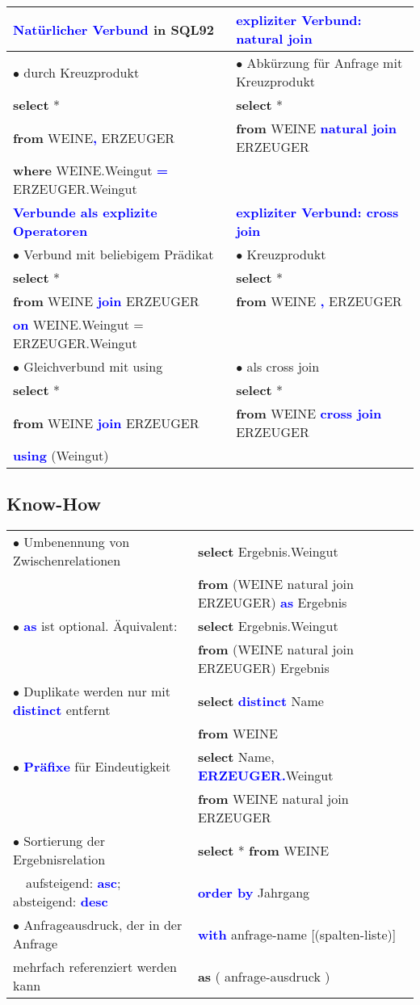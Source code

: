 \documentclass{scrartcl}
\newcommand{\key}[1]{{\textcolor{blue}{\textbf{#1}}}}
\newcommand{\select}{\textbf{select }}
\newcommand{\from}{\textbf{from }}
\newcommand{\where}{\textbf{where }}
\begin{document}
{\renewcommand{\arraystretch}{1.25}
\begin{tabular}{|l|l|}
	\hline
	\key{Natürlicher Verbund} in SQL92 & \key{expliziter Verbund: natural join}  \\
	\hline
	$\bullet$ durch Kreuzprodukt & $\bullet$ Abkürzung für Anfrage mit Kreuzprodukt \\
	\select * & \select *  \\
	\from WEINE\key{,} ERZEUGER & \from WEINE \key{natural join} ERZEUGER \\
	\where WEINE.Weingut \key{=} ERZEUGER.Weingut &\\
	\hline
	\key{Verbunde als explizite Operatoren} & \key{expliziter Verbund: cross join}\\
	\hline
	$\bullet$ Verbund mit beliebigem Prädikat & $\bullet$ Kreuzprodukt\\
	\select * & \select *\\
	\from WEINE \key{join} ERZEUGER & \from WEINE \key{,} ERZEUGER\\
	\key{on} WEINE.Weingut = ERZEUGER.Weingut & \\
	$\bullet$ Gleichverbund mit using & $\bullet$ als cross join\\
	\select * & \select *\\
	\from WEINE \key{join} ERZEUGER & \from WEINE \key{cross join} ERZEUGER\\
	\key{using} (Weingut) & \\
	\hline
\end{tabular}
}

\subsection{Know-How}

{\renewcommand{\arraystretch}{1.25}
\begin{tabular}{ll}
	$\bullet$ Umbenennung von Zwischenrelationen & \select Ergebnis.Weingut \\
	 & \from (WEINE natural join ERZEUGER) \key{as} Ergebnis \\
	$\bullet$ \key{as} ist optional. Äquivalent: & \select Ergebnis.Weingut \\
	 & \from (WEINE natural join ERZEUGER) Ergebnis \\
	$\bullet$ Duplikate werden nur mit \key{distinct} entfernt &  \select \key{distinct} Name\\
	 & \from WEINE \\
	$\bullet$ \key{Präfixe} für Eindeutigkeit & \select Name, \key{ERZEUGER.}Weingut\\
	 & \from WEINE natural join ERZEUGER \\
	$\bullet$ Sortierung der Ergebnisrelation & \select * \from WEINE \\
	 \ \ aufsteigend: \key{asc}; absteigend: \key{desc}& \key{order by} Jahrgang \\
	 $\bullet$ Anfrageausdruck, der in der Anfrage  & \key{with} anfrage-name [(spalten-liste)] \\ 
	 mehrfach referenziert werden kann & \textbf{as} ( anfrage-ausdruck )\\
\end{tabular}
}
\end{document}
